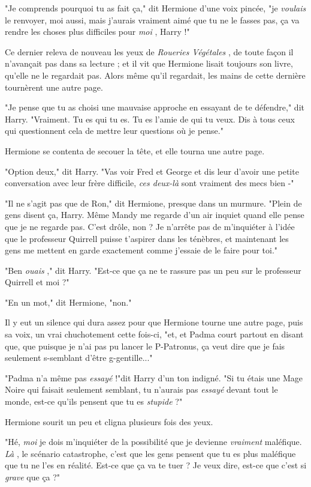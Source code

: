 "Je comprends pourquoi tu as fait ça," dit Hermione d'une voix pincée, "je \emph{voulais}  le renvoyer, moi aussi, mais j'aurais vraiment aimé que tu ne le fasses pas, ça va rendre les choses plus difficiles pour \emph{moi} , Harry !"

Ce dernier releva de nouveau les yeux de \emph{Roueries Végétales} , de toute façon il n'avançait pas dans sa lecture ; et il vit que Hermione lisait toujours son livre, qu'elle ne le regardait pas. Alors même qu'il regardait, les mains de cette dernière tournèrent une autre page.

"Je pense que tu as choisi une mauvaise approche en essayant de te défendre," dit Harry. "Vraiment. Tu es qui tu es. Tu es l'amie de qui tu veux. Dis à tous ceux qui questionnent cela de mettre leur questions où je pense."

Hermione se contenta de secouer la tête, et elle tourna une autre page.

"Option deux," dit Harry. "Vas voir Fred et George et dis leur d'avoir une petite conversation avec leur frère difficile, \emph{ces deux-là}  sont vraiment des mecs bien -"

"Il ne s'agit pas que de Ron," dit Hermione, presque dans un murmure. "Plein de gens disent ça, Harry. Même Mandy me regarde d'un air inquiet quand elle pense que je ne regarde pas. C'est drôle, non ? Je n'arrête pas de m'inquiéter à l'idée que le professeur Quirrell puisse t'aspirer dans les ténèbres, et maintenant les gens me mettent en garde exactement comme j'essaie de le faire pour toi."

"Ben \emph{ouais} ," dit Harry. "Est-ce que ça ne te rassure pas un peu sur le professeur Quirrell et moi ?"

"En un mot," dit Hermione, "non."

Il y eut un silence qui dura assez pour que Hermione tourne une autre page, puis sa voix, un vrai chuchotement cette fois-ci, "et, et Padma court partout en disant que, que puisque je n'ai pas pu lancer le P-Patronus, ça veut dire que je fais seulement s-semblant d'être g-gentille..."

"Padma n'a même pas \emph{essayé}  !"dit Harry d'un ton indigné. "Si tu étais une Mage Noire qui faisait seulement semblant, tu n'aurais pas \emph{essayé}  devant tout le monde, est-ce qu'ils pensent que tu es \emph{stupide}  ?"

Hermione sourit un peu et cligna plusieurs fois des yeux.

"Hé, \emph{moi}  je dois m'inquiéter de la possibilité que je devienne \emph{vraiment}  maléfique. \emph{Là} , le scénario catastrophe, c'est que les gens pensent que tu es plus maléfique que tu ne l'es en réalité. Est-ce que ça va te tuer ? Je veux dire, est-ce que c'est si \emph{grave}  que ça ?"

